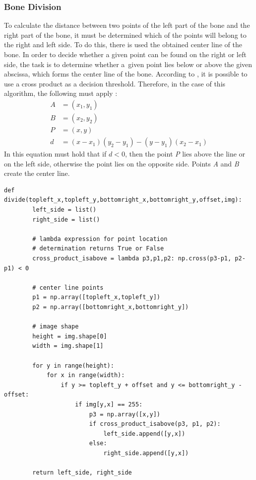\subsubsection*{Bone Division}
To calculate the distance between two points of the left part of the bone and the right part of the bone, it must be determined which of the points will belong to the right and left side. To do this, there is used the obtained center line of the bone. In order to decide whether a given point can be found on the right or left side, the task is to determine whether a~given point lies below or above the given abscissa, which forms the center line of the bone. According to \cite{cross-product-isabove}, it is possible to use a cross product as a decision threshold. Therefore, in the case of this algorithm, the following must apply \cite{cross-product-equation}:
\begin{equation}
\begin{split}
A &= (x_1,y_1)\\
B &= (x_2,y_2)\\
P &= (x,y)\\
d &= (x - x_1)(y_2 - y_1) - (y - y_1)(x_2 - x_1)
\end{split}
\end{equation}
In this equation must hold that if \(d <0 \), then the point \textit{P} lies above the line or on the left side, otherwise the point lies on the opposite side. Points \textit{A} and \textit{B} create the center line.
\begin{lstlisting}[label={bone-division-code}, caption={\textbf{Python code function.} Function divides bone into two halves using center line.}]
def divide(topleft_x,topleft_y,bottomright_x,bottomright_y,offset,img):
        left_side = list()
        right_side = list()
        
        # lambda expression for point location 
        # determination returns True or False
        cross_product_isabove = lambda p3,p1,p2: np.cross(p3-p1, p2-p1) < 0
    
        # center line points
        p1 = np.array([topleft_x,topleft_y])
        p2 = np.array([bottomright_x,bottomright_y])
        
        # image shape
        height = img.shape[0]
        width = img.shape[1]

        for y in range(height):
            for x in range(width):
                if y >= topleft_y + offset and y <= bottomright_y - offset:
                    if img[y,x] == 255:
                        p3 = np.array([x,y])
                        if cross_product_isabove(p3, p1, p2):
                            left_side.append([y,x])
                        else:
                            right_side.append([y,x])

        return left_side, right_side
\end{lstlisting}

